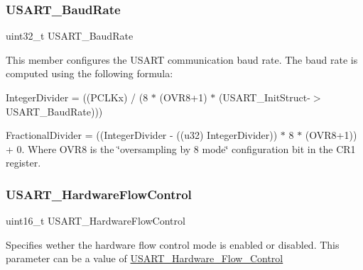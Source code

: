 \subsubsection{\texorpdfstring{U\+S\+A\+R\+T\+\_\+\+Baud\+Rate}{USART\_BaudRate}}
{\footnotesize\ttfamily uint32\+\_\+t U\+S\+A\+R\+T\+\_\+\+Baud\+Rate}

This member configures the U\+S\+A\+RT communication baud rate. The baud rate is computed using the following formula\+:
\begin{DoxyItemize}
\item Integer\+Divider = ((P\+C\+L\+Kx) / (8 $\ast$ (O\+V\+R8+1) $\ast$ (U\+S\+A\+R\+T\+\_\+\+Init\+Struct-\/$>$U\+S\+A\+R\+T\+\_\+\+Baud\+Rate)))
\item Fractional\+Divider = ((Integer\+Divider -\/ ((u32) Integer\+Divider)) $\ast$ 8 $\ast$ (O\+V\+R8+1)) + 0. Where O\+V\+R8 is the \char`\"{}oversampling by 8 mode\char`\"{} configuration bit in the C\+R1 register. 
\end{DoxyItemize}\mbox{\label{struct_u_s_a_r_t___init_type_def_ab41fe3b9f5cb4ed89be23bff0a1f4114}} 
\subsubsection{\texorpdfstring{U\+S\+A\+R\+T\+\_\+\+Hardware\+Flow\+Control}{USART\_HardwareFlowControl}}
{\footnotesize\ttfamily uint16\+\_\+t U\+S\+A\+R\+T\+\_\+\+Hardware\+Flow\+Control}

Specifies wether the hardware flow control mode is enabled or disabled. This parameter can be a value of \mbox{\hyperlink{group___u_s_a_r_t___hardware___flow___control}{U\+S\+A\+R\+T\+\_\+\+Hardware\+\_\+\+Flow\+\_\+\+Control}} \mbox{\label{struct_u_s_a_r_t___init_type_def_a1a581f24451bf5a4a210bab8d68998e2}} 
